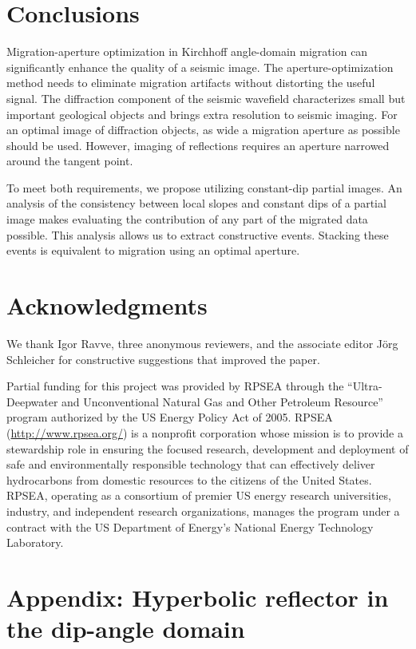 \section {Conclusions}

Migration-aperture optimization in Kirchhoff angle-domain migration can significantly enhance
the quality of a seismic image. The aperture-optimization
method needs to eliminate migration artifacts without distorting the useful signal. The diffraction component of the seismic wavefield
characterizes small but important geological objects and brings extra resolution to seismic imaging. For an optimal image of diffraction
objects, as wide a migration aperture as possible should be used. However, imaging of reflections requires an aperture narrowed
around the tangent point. 

To meet both requirements, we propose utilizing constant-dip partial images. An analysis of the consistency between local slopes and
constant dips of a partial image makes evaluating the contribution of any part of the migrated data possible. This analysis allows us
to extract constructive events. Stacking these events is equivalent to migration using an optimal aperture.

\section{Acknowledgments}

We thank Igor Ravve, three anonymous reviewers, and the associate editor J\"{o}rg Schleicher for constructive suggestions that improved the paper.

Partial funding for this project was provided by RPSEA through the ``Ultra-Deepwater and Unconventional 
Natural Gas and Other Petroleum Resource'' program authorized by the US Energy Policy Act of 2005. 
RPSEA (\url{http://www.rpsea.org/}) is a nonprofit corporation whose mission is to provide a stewardship 
role in ensuring the focused research, development and deployment of safe and environmentally
responsible technology that can effectively deliver hydrocarbons from domestic resources to the 
citizens of the United States. RPSEA, operating as a consortium of premier US energy research universities, 
industry, and independent research organizations, manages the program under a contract with the US Department 
of Energy’s National Energy Technology Laboratory.

\appendix
\section{Appendix: Hyperbolic reflector in the dip-angle domain}

